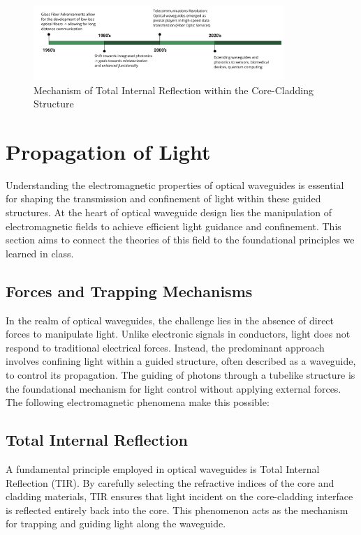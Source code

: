 \documentclass[10pt]{article}
\begin{document}
\begin{figure}[h]
    \centering
    \includegraphics[width = 9.5cm]{Timeline.png}
    \caption{Mechanism of Total Internal Reflection within the Core-Cladding Structure} 
    \end{figure}



\section{Propagation of Light}

Understanding the electromagnetic properties of optical waveguides is essential for 
shaping the transmission and confinement of light within these guided structures. 
At the heart of optical waveguide design lies the manipulation of electromagnetic 
fields to achieve efficient light guidance and confinement. This section aims to connect the 
theories of this field to the foundational principles we learned in class.

\subsection{Forces and Trapping Mechanisms}

In the realm of optical waveguides, the challenge lies in the absence of direct forces to manipulate light. 
Unlike electronic signals in conductors, light does not respond to traditional electrical forces. 
Instead, the predominant approach involves confining light within a guided structure, often described as a waveguide, 
to control its propagation. The guiding of photons through a tubelike structure is the foundational mechanism for light control without 
applying external forces. The following electromagnetic phenomena make this possible:

\subsection{Total Internal Reflection}
A fundamental principle employed in optical waveguides is Total Internal Reflection (TIR). By carefully selecting the refractive indices of the core and cladding materials, TIR ensures that light incident on the core-cladding interface is reflected entirely back into the core. This phenomenon acts as the mechanism for trapping and guiding light along the waveguide.
\end{document}
